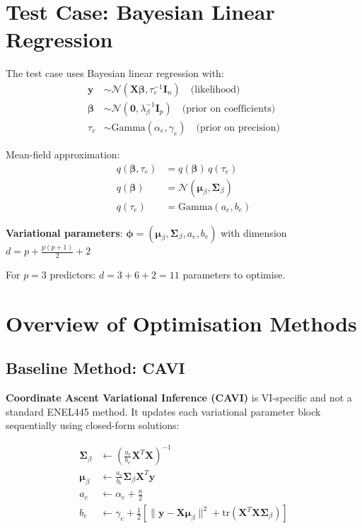 \documentclass[11pt]{article}
\newcommand{\N}{\mathcal{N}}
\newcommand{\tr}{\text{tr}}
\begin{document}
\section{Test Case: Bayesian Linear Regression}

The test case uses Bayesian linear regression with:
\begin{align}
\bm{y} &\sim \N(\bm{X}\bm{\beta}, \tau_e^{-1} \bm{I}_n) \quad \text{(likelihood)}\\
\bm{\beta} &\sim \N(\bm{0}, \lambda_\beta^{-1} \bm{I}_p) \quad \text{(prior on coefficients)}\\
\tau_e &\sim \text{Gamma}(\alpha_e, \gamma_e) \quad \text{(prior on precision)}
\end{align}

Mean-field approximation:
\begin{align}
q(\bm{\beta}, \tau_e) &= q(\bm{\beta}) \, q(\tau_e)\\
q(\bm{\beta}) &= \N(\bm{\mu}_\beta, \bm{\Sigma}_\beta)\\
q(\tau_e) &= \text{Gamma}(a_e, b_e)
\end{align}

\textbf{Variational parameters}: $\bm{\phi} = (\bm{\mu}_\beta, \bm{\Sigma}_\beta, a_e, b_e)$ with dimension $d = p + \frac{p(p+1)}{2} + 2$

For $p=3$ predictors: $d = 3 + 6 + 2 = 11$ parameters to optimise.

\section{Overview of Optimisation Methods}

\subsection{Baseline Method: CAVI}

\textbf{Coordinate Ascent Variational Inference (CAVI)} is VI-specific and not a standard ENEL445 method. It updates each variational parameter block sequentially using closed-form solutions:

\begin{align}
\bm{\Sigma}_\beta &\leftarrow \left(\frac{a_e}{b_e} \bm{X}^T\bm{X}\right)^{-1}\\
\bm{\mu}_\beta &\leftarrow \frac{a_e}{b_e} \bm{\Sigma}_\beta \bm{X}^T\bm{y}\\
a_e &\leftarrow \alpha_e + \frac{n}{2}\\
b_e &\leftarrow \gamma_e + \frac{1}{2}\left[\|\bm{y} - \bm{X}\bm{\mu}_\beta\|^2 + \tr(\bm{X}^T\bm{X}\bm{\Sigma}_\beta)\right]
\end{align}
\end{document}
